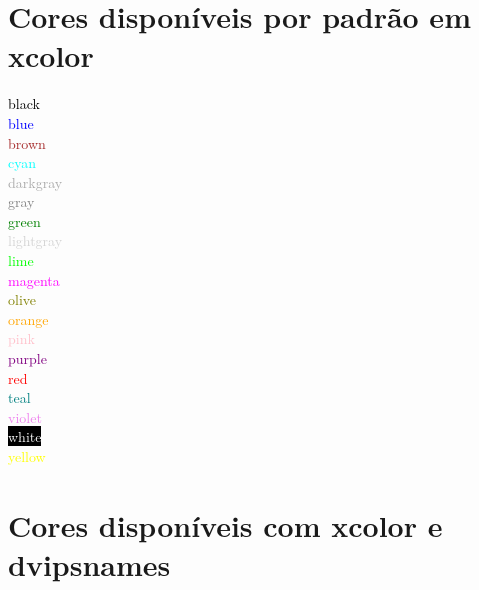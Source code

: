 \documentclass{article}
\begin{document}
\section{Cores disponíveis por padrão em xcolor}

\textcolor{black}{black}\\
\textcolor{blue}{blue}\\
\textcolor{brown}{brown}\\
\textcolor{cyan}{cyan}\\
\textcolor{darkgray}{darkgray}\\
\textcolor{gray}{gray}\\
\textcolor{green}{green}\\
\textcolor{lightgray}{lightgray}\\
\textcolor{lime}{lime}\\
\textcolor{magenta}{magenta}\\
\textcolor{olive}{olive}\\
\textcolor{orange}{orange}\\
\textcolor{pink}{pink}\\
\textcolor{purple}{purple}\\
\textcolor{red}{red}\\
\textcolor{teal}{teal}\\
\textcolor{violet}{violet}\\
\colorbox{black}{\textcolor{white}{white}}\\
\textcolor{yellow}{yellow}

\section{Cores disponíveis com xcolor e dvipsnames}
\end{document}
